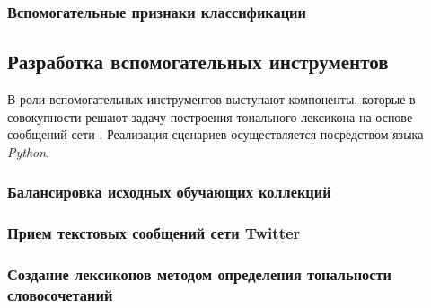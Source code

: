 




    \subsubsection{Вспомогательные признаки классификации}

\subsection{Разработка вспомогательных инструментов}
В роли вспомогательных инструментов выступают компоненты, которые в совокупности
решают задачу построения тонального лексикона на основе сообщений сети \twitter.
Реализация сценариев осуществляется посредством языка {\it Python}.

    \subsubsection{Балансировка исходных обучающих коллекций}

    \subsubsection{Прием текстовых сообщений сети Twitter}

    \subsubsection{Создание лексиконов методом определения тональности словосочетаний}

